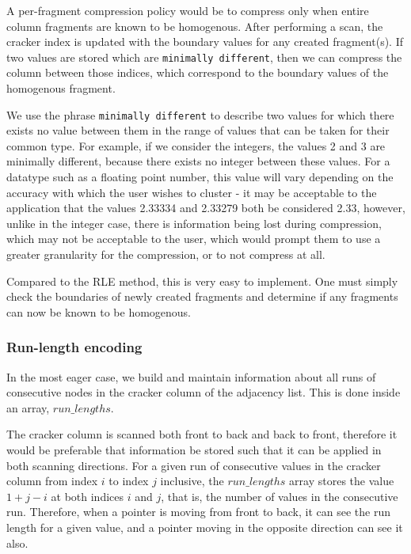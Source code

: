 A per-fragment compression policy would be to compress only when entire column fragments are
known to be homogenous. After performing a scan, the cracker index is updated with the boundary
values for any created fragment(s). If two values are stored which are \texttt{minimally different},
then we can compress the column between those indices, which correspond to the boundary values of the
homogenous fragment.

We use the phrase \texttt{minimally different} to describe two values for which there exists no value
between them in the range of values that can be taken for their common type. For example, if we
consider the integers, the values 2 and 3 are minimally different, because there exists no integer
between these values. For a datatype such as a floating point number, this value will vary depending
on the accuracy with which the user wishes to cluster - it may be acceptable to the application that
the values 2.33334 and 2.33279 both be considered 2.33, however, unlike in the integer case, there is
information being lost during compression, which may not be acceptable to the user, which would prompt
them to use a greater granularity for the compression, or to not compress at all.

Compared to the RLE method, this is very easy to implement. One must simply check the boundaries of
newly created fragments and determine if any fragments can now be known to be homogenous.

\subsubsection{Run-length encoding}

In the most eager case, we build and maintain information about all runs of consecutive nodes in the
cracker column of the adjacency list. This is done inside an array, $run\_lengths$.

The cracker column is scanned both front to back and back to front, therefore it would be preferable
that information be stored such that it can be applied in both scanning directions. For a given run of
consecutive values in the cracker column from index $i$ to index $j$ inclusive, the $run\_lengths$
array stores the value $1 + j - i$ at both indices $i$ and $j$, that is, the number of values in the
consecutive run. Therefore, when a pointer is moving from front to back, it can see the run length for
a given value, and a pointer moving in the opposite direction can see it also.


